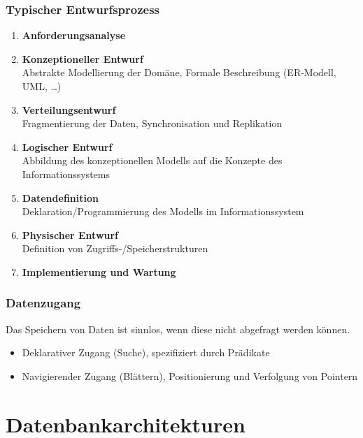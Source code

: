         \subsection{Typischer Entwurfsprozess} %
            \begin{enumerate}
            	\item \textbf{Anforderungsanalyse}
            	\item \textbf{Konzeptioneller Entwurf} \\ Abstrakte Modellierung der Domäne, Formale Beschreibung (ER-Modell, UML, \dots)
            	\item \textbf{Verteilungsentwurf} \\ Fragmentierung der Daten, Synchronisation und Replikation
            	\item \textbf{Logischer Entwurf} \\ Abbildung des konzeptionellen Modells auf die Konzepte des Informationssystems
            	\item \textbf{Datendefinition} \\ Deklaration/Programmierung des Modells im Informationssystem
            	\item \textbf{Physischer Entwurf} \\ Definition von Zugriffs-/Speicherstrukturen
            	\item \textbf{Implementierung und Wartung}
            \end{enumerate}

        \subsection{Datenzugang} %
            Das Speichern von Daten ist sinnlos, wenn diese nicht abgefragt werden können.
            
            \begin{itemize}
            	\item Deklarativer Zugang (Suche), spezifiziert durch Prädikate
            	\item Navigierender Zugang (Blättern), Positionierung und Verfolgung von Pointern
            \end{itemize}

\chapter{Datenbankarchitekturen} %
    \label{c:dbarchs}

